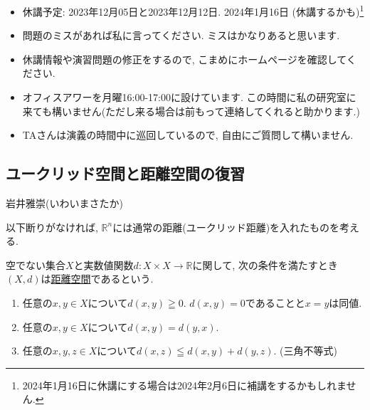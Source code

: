 \documentclass[dvipdfmx,a4paper,11pt]{article}
\newcommand{\R}{\mathbb{R}}
\theoremstyle{definition}
\begin{document}
\vspace{11pt}
\begin{itemize}
  \setlength{\parskip}{0cm} %
  \setlength{\itemsep}{0cm} %
  \item 休講予定: 2023年12月05日と2023年12月12日. 2024年1月16日 (休講するかも)\footnote{2024年1月16日に休講にする場合は2024年2月6日に補講をするかもしれません.} 
    \item 問題のミスがあれば私に言ってください. ミスはかなりあると思います. 
  \item 休講情報や演習問題の修正をするので, こまめにホームページを確認してください.
    \item オフィスアワーを月曜16:00-17:00に設けています. この時間に私の研究室に来ても構いません(ただし来る場合は前もって連絡してくれると助かります.)
    \item TAさんは演義の時間中に巡回しているので, 自由にご質問して構いません. 
 \end{itemize}
 
\newpage

\begin{center}
\section{ユークリッド空間と距離空間の復習}
\label{sec-euc}
\end{center}
\begin{flushright}
 岩井雅崇(いわいまさたか)
\end{flushright}

以下断りがなければ, $\R^{n}$には通常の距離(ユークリッド距離)を入れたものを考える. 
\begin{tcolorbox}[
    colback = white,
    colframe = green!35!black,
    fonttitle = \bfseries,
    breakable = true]
    空でない集合$X$と実数値関数$d : X \times X \rightarrow \R$に関して, 次の条件を満たすとき$(X,d)$は\underline{距離空間}であるという.
    \begin{enumerate}
    \setlength{\parskip}{0cm} 
  \setlength{\itemsep}{0cm} 
    \item 任意の$x,y \in X$について$d(x,y) \geqq 0$. $d(x,y)=0$であることと$x=y$は同値. 
    \item 任意の$x,y \in X$について$d(x,y)=d(y,x)$.
    \item 任意の$x,y,z \in X$について$d(x,z) \leqq d(x,y) + d(y,z)$. (三角不等式)
    \end{enumerate}
 \end{tcolorbox}
 
\end{document}
